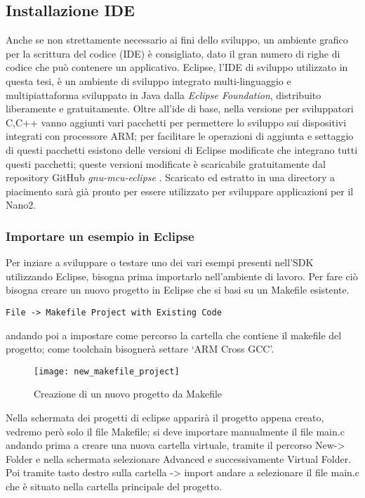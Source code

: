 \subsection{Installazione IDE}
Anche se non strettamente necessario ai fini dello sviluppo, un ambiente grafico per la scrittura del codice (IDE) è consigliato, dato il gran numero di righe di codice che può contenere un applicativo. Eclipse, l'IDE di sviluppo utilizzato in questa tesi, è un ambiente di sviluppo integrato multi-linguaggio e multipiattaforma sviluppato in Java dalla \emph{Eclipse Foundation}, distribuito liberamente e gratuitamente.
Oltre all'ide di base, nella versione per sviluppatori C,C++ vanno aggiunti vari pacchetti per permettere lo sviluppo sui dispositivi integrati con processore ARM; per facilitare le operazioni di aggiunta e settaggio di questi pacchetti esistono delle versioni di Eclipse modificate che integrano tutti questi pacchetti; queste versioni modificate è scaricabile gratuitamente dal repository GitHub \emph{gnu-mcu-eclipse} \cite{gnueclipseweb}. Scaricato ed estratto in una directory a piacimento sarà già pronto per essere utilizzato per sviluppare applicazioni per il Nano2.
\subsubsection{Importare un esempio in Eclipse}
Per inziare a sviluppare o testare uno dei vari esempi presenti nell'SDK utilizzando Eclipse, bisogna prima importarlo nell'ambiente di lavoro. 
Per fare ciò bisogna creare un nuovo progetto in Eclipse che si basi su un Makefile esistente.

\begin{verbatim}
File -> Makefile Project with Existing Code
\end{verbatim}
andando poi a impostare come percorso la cartella che contiene il makefile del progetto; come toolchain bisognerà settare \lq ARM Cross GCC\rq .

\begin{figure}[H]
\texttt{[image: new\_makefile\_project]}
\centering
\caption{Creazione di un nuovo progetto da Makefile}
\label{makefile_proj}
\end{figure}

Nella schermata dei progetti di eclipse apparirà il progetto appena creato, vedremo però solo il file Makefile; si deve importare manualmente il file main.c andando prima a creare una nuova cartella virtuale, tramite il percorso New-> Folder e nella schermata selezionare Advanced e successivamente Virtual Folder. Poi tramite tasto destro sulla cartella -> import andare a selezionare il file main.c che è situato nella cartella principale del progetto.

